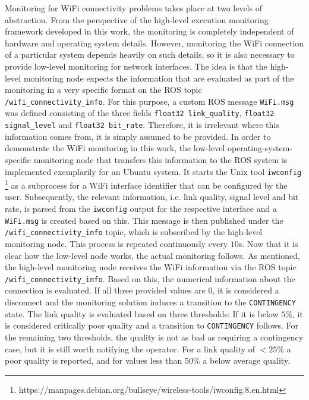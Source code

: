 \documentclass[english, master, utf8]{base/thesis_KBS}
\newcommand{\code}[1]{\colorbox{light-gray}{\texttt{#1}}}
\begin{document}
\noindent
Monitoring for WiFi connectivity problems takes place at two levels of abstraction. From the perspective of the high-level execution monitoring framework developed in this work,
the monitoring is completely independent of hardware and operating system details. However, monitoring the WiFi connection of a particular system depends heavily on such details,
so it is also necessary to provide low-level monitoring for network interfaces. The idea is that the high-level monitoring node expects the information that are evaluated as part 
of the monitoring in a very specific format on the ROS topic \code{/wifi\_connectivity\_info}. For this purpose, a custom ROS message \code{WiFi.msg} was defined consisting of the
three fields \code{float32 link\_quality}, \code{float32 signal\_level} and \code{float32 bit\_rate}. Therefore, it is irrelevant where this information comes from, it is simply
assumed to be provided. In order to demonstrate the WiFi monitoring in this work, the low-level operating-system-specific monitoring node that transfers this
information to the ROS system is implemented exemplarily for an Ubuntu system. It starts the Unix tool \code{iwconfig}
\footnote{https://manpages.debian.org/bullseye/wireless-tools/iwconfig.8.en.html} as a subprocess for a WiFi interface identifier that can be configured by the user. Subsequently,
the relevant information, i.e. link quality, signal level and bit rate, is parsed from the \code{iwconfig} output for the respective interface and a \code{WiFi.msg} is created
based on this. This message is then published under the \code{/wifi\_connectivity\_info} topic, which is subscribed by the high-level monitoring node. This process is repeated
continuously every $10$s.\newline
Now that it is clear how the low-level node works, the actual monitoring follows. As mentioned, the high-level monitoring node receives the WiFi information via the ROS topic
\code{/wifi\_connectivity\_info}. Based on this, the numerical information about the connection is evaluated. If all three provided values are $0$, it is considered
a disconnect and the monitoring solution induces a transition to the \code{CONTINGENCY} state. The link quality is evaluated based on three thresholds: If it is below $5\%$,
it is considered critically poor quality and a transition to \code{CONTINGENCY} follows. For the remaining two thresholds, the quality is not as bad as requiring a contingency
case, but it is still worth notifying the operator. For a link quality of $< 25\%$ a poor quality is reported, and for values less than $50\%$ a below average quality.
\end{document}
